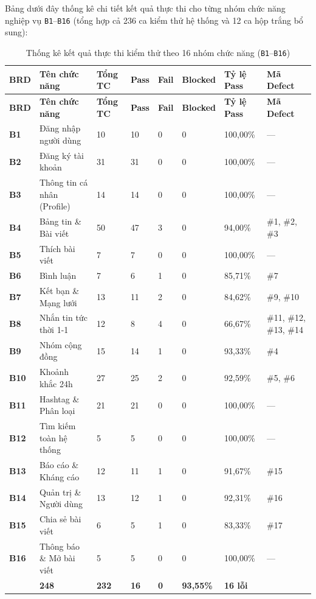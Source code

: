 \documentclass[11pt,a4paper]{article}
\begin{document}
Bảng dưới đây thống kê chi tiết kết quả thực thi cho từng nhóm chức năng nghiệp vụ \texttt{B1}--\texttt{B16} (tổng hợp cả 236 ca kiểm thử hệ thống và 12 ca hộp trắng bổ sung):

\begin{longtable}{|C{0.9cm}|L{3.55cm}|C{1.25cm}|C{1.15cm}|C{1.05cm}|C{1.45cm}|C{1.6cm}|L{2.8cm}|}
\hline
{}
\textbf{BRD} & \textbf{Tên chức năng} & \textbf{Tổng TC} & \textbf{Pass} & \textbf{Fail} & \textbf{Blocked} & \textbf{Tỷ lệ Pass} & \textbf{Mã Defect} \tabularnewline
\hline
\endfirsthead
\hline
{}
\textbf{BRD} & \textbf{Tên chức năng} & \textbf{Tổng TC} & \textbf{Pass} & \textbf{Fail} & \textbf{Blocked} & \textbf{Tỷ lệ Pass} & \textbf{Mã Defect} \tabularnewline
\hline
\endhead
\hline
\endfoot
\hline
\caption{Thống kê kết quả thực thi kiểm thử theo 16 nhóm chức năng (\texttt{B1}--\texttt{B16})}
\endlastfoot
\textbf{B1} & Đăng nhập người dùng & 10 & 10 & 0 & 0 & 100,00\% & --- \\ \hline
\textbf{B2} & Đăng ký tài khoản & 31 & 31 & 0 & 0 & 100,00\% & --- \\ \hline
\textbf{B3} & Thông tin cá nhân (Profile) & 14 & 14 & 0 & 0 & 100,00\% & --- \\ \hline
\textbf{B4} & Bảng tin \& Bài viết & 50 & 47 & 3 & 0 & 94,00\% & \#1, \#2, \#3 \\ \hline
\textbf{B5} & Thích bài viết & 7 & 7 & 0 & 0 & 100,00\% & --- \\ \hline
\textbf{B6} & Bình luận & 7 & 6 & 1 & 0 & 85,71\% & \#7 \\ \hline
\textbf{B7} & Kết bạn \& Mạng lưới & 13 & 11 & 2 & 0 & 84,62\% & \#9, \#10 \\ \hline
\textbf{B8} & Nhắn tin tức thời 1-1 & 12 & 8 & 4 & 0 & 66,67\% & \#11, \#12, \#13, \#14 \\ \hline
\textbf{B9} & Nhóm cộng đồng & 15 & 14 & 1 & 0 & 93,33\% & \#4 \\ \hline
\textbf{B10} & Khoảnh khắc 24h & 27 & 25 & 2 & 0 & 92,59\% & \#5, \#6 \\ \hline
\textbf{B11} & Hashtag \& Phân loại & 21 & 21 & 0 & 0 & 100,00\% & --- \\ \hline
\textbf{B12} & Tìm kiếm toàn hệ thống & 5 & 5 & 0 & 0 & 100,00\% & --- \\ \hline
\textbf{B13} & Báo cáo \& Kháng cáo & 12 & 11 & 1 & 0 & 91,67\% & \#15 \\ \hline
\textbf{B14} & Quản trị \& Người dùng & 13 & 12 & 1 & 0 & 92,31\% & \#16 \\ \hline
\textbf{B15} & Chia sẻ bài viết & 6 & 5 & 1 & 0 & 83,33\% & \#17 \\ \hline
\textbf{B16} & Thông báo \& Mở bài viết & 5 & 5 & 0 & 0 & 100,00\% & --- \\ \hline
{}
 & \textbf{248} & \textbf{232} & \textbf{16} & \textbf{0} & \textbf{93,55\%} & \textbf{16 lỗi} \\ \hline
\end{longtable}
\end{document}
